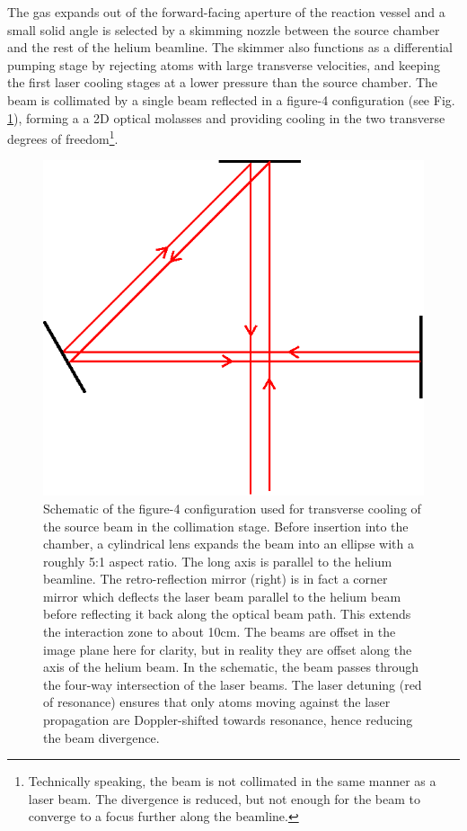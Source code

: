 	The gas expands out of the forward-facing aperture of the reaction vessel and a small solid angle is selected by a skimming nozzle between the source chamber and the rest of the helium beamline.
	The skimmer also functions as a differential pumping stage by rejecting atoms with large transverse velocities, and keeping the first laser cooling stages at a lower pressure than the source chamber.
	The beam is collimated by a single beam reflected in a figure-4 configuration (see Fig. \ref{fig:figure_4}), forming a a 2D optical molasses\cite{Lett81,Rooijakkers96} and providing cooling in the two transverse degrees of freedom\footnote{Technically speaking, the beam is not collimated in the same manner as a laser beam.
	The divergence is reduced, but not enough for the beam to converge to a focus further along the beamline.}.
	\begin{figure}
		\centering
		\includegraphics{fig/apparatus/figure_4_beams}
		\caption{Schematic of the figure-4 configuration used for transverse cooling of the source beam in the collimation stage. Before insertion into the chamber, a cylindrical lens expands the beam into an ellipse with a roughly 5:1 aspect ratio. The long axis is parallel to the helium beamline. The retro-reflection mirror (right) is in fact a corner mirror which deflects the laser beam parallel to the helium beam before reflecting it back along the optical beam path.  
		This extends the interaction zone to about 10cm. 
		The beams are offset in the image plane here for clarity, but in reality they are offset along the axis of the helium beam.
		In the schematic, the beam passes through the four-way intersection of the laser beams. 
		The laser detuning (red of resonance) ensures that only atoms moving against the laser propagation are Doppler-shifted towards resonance, hence reducing the beam divergence.}
		\label{fig:figure_4}
	\end{figure}


